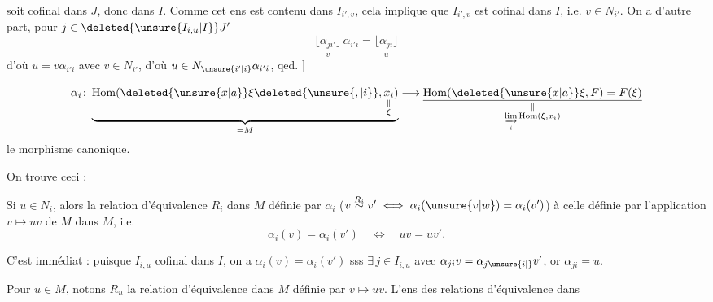 
soit cofinal dans $J$, donc dans $I$. Comme cet ens  est contenu dans $I_{i',v}$, cela implique que $I_{i',v}$ est cofinal dans $I$, i.e. $v\in N_{i'}$. On a d'autre part, pour $j\in\deleted{\unsure{I_{i,u}|I}}J'$
\[
\underset{v}{\lfloor\!\underline{\alpha_{ji'}}\!\rfloor}\,\alpha_{i'i}=\underset{u}{\lfloor\!\underline{\alpha_{ji}}\!\rfloor}
\]
d'où $u=v\alpha_{i'i}$ avec $v\in N_{i'}$, d'où $u\in N_{\unsure{i'|i}}\alpha_{i'i}$, qed. $\big]$

 
\[
\alpha_i\colon\underbrace{\mathrm{Hom}(\deleted{\unsure{x|a}}\xi\deleted{\unsure{\,\!,|i}},\underset{\substack{\Vert\\\xi}}{x_i})}_{=M}\longrightarrow
\underset{\substack{\Vert\\\underset{i}{\varinjlim}\,\mathrm{Hom}(\xi,x_i)}}{\underline{\mathrm{Hom}(\deleted{\unsure{x|a}}\xi,F)=F(\xi)}}
\]
le morphisme canonique.

On trouve ceci :

\noindent{}Si $u\in N_i$, alors la relation d'équivalence $R_i$ dans $M$ définie par $\alpha_i$ ($v\overset{R_i}{\sim}v'\iff\alpha_i(\unsure{v|w})=\alpha_i(v')$)   à celle définie par l'application $v\longmapsto uv$ de $M$ dans $M$, i.e.
\[
\alpha_i(v)=\alpha_i(v')\quad\Longleftrightarrow\quad uv=uv'.
\]

C'est immédiat : puisque $I_{i,u}$  cofinal dans $I$,  on a $\alpha_i(v)=\alpha_i(v')$ sss $\exists\, j\in I_{i,u}$ avec $\alpha_{ji}v=\alpha_{j\unsure{i|{}}}v'$, or $\alpha_{ji}=u$.


Pour $u\in M$, notons $R_u$ la relation d'équivalence dans $M$ définie par $v\longmapsto uv$. L'ens des relations d'équivalence dans

